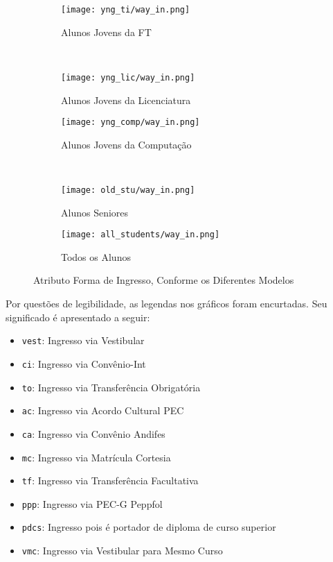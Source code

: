 \clearpage
\begin{figure}[!ht]
    \centering
    \begin{subfigure}[b]{0.48\textwidth}
        \centering
        \texttt{[image: yng\_ti/way\_in.png]}
        \caption{Alunos Jovens da FT}
    \end{subfigure}
    ~
    \begin{subfigure}[b]{0.48\textwidth}
        \centering
        \texttt{[image: yng\_lic/way\_in.png]}
        \caption{Alunos Jovens da Licenciatura}
    \end{subfigure}

    \begin{subfigure}[b]{0.48\textwidth}
        \centering
        \texttt{[image: yng\_comp/way\_in.png]}
        \caption{Alunos Jovens da Computação}
    \end{subfigure}
    ~
    \begin{subfigure}[b]{0.48\textwidth}
        \centering
        \texttt{[image: old\_stu/way\_in.png]}
        \caption{Alunos Seniores}
    \end{subfigure}

    \begin{subfigure}[b]{0.48\textwidth}
        \centering
        \texttt{[image: all\_students/way\_in.png]}
        \caption{Todos os Alunos}
    \end{subfigure}
    \caption{Atributo Forma de Ingresso, Conforme os Diferentes Modelos}
\end{figure}

Por questões de legibilidade, as legendas nos gráficos foram encurtadas. Seu significado é
apresentado a seguir: 
\begin{itemize}
    \item \texttt{vest}: Ingresso via Vestibular
    \item \texttt{ci}: Ingresso via Convênio-Int
    \item \texttt{to}: Ingresso via Transferência Obrigatória
    \item \texttt{ac}: Ingresso via Acordo Cultural PEC
    \item \texttt{ca}: Ingresso via Convênio Andifes
    \item \texttt{mc}: Ingresso via Matrícula Cortesia
    \item \texttt{tf}: Ingresso via Transferência Facultativa
    \item \texttt{ppp}: Ingresso via PEC-G Peppfol
    \item \texttt{pdcs}: Ingresso pois é portador de diploma de curso superior
    \item \texttt{vmc}: Ingresso via Vestibular para Mesmo Curso
\end{itemize}

